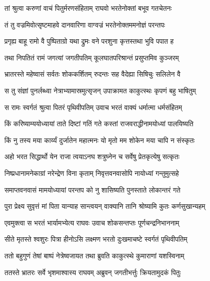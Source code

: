 
\twolineshloka
{तां श्रुत्वा करुणां वाचं पितुर्मरणसंहिताम्}
{राघवो भरतेनोक्तां बभूव गतचेतनः} %

\twolineshloka
{तं तु वज्रमिवोत्सृष्टमाहवे दानवारिणा}
{वाग्वज्रं भरतेनोक्तममनोज्ञं परन्तपः} %

\twolineshloka
{प्रगृह्य बाहू रामो वै पुष्पिताग्रो यथा द्रुमः}
{वने परशुना कृत्तस्तथा भुवि पपात ह} %

\twolineshloka
{तथा निपतितं रामं जगत्यां जगतीपतिम्}
{कूलघातपरिश्रान्तं प्रसुप्तमिव कुञ्जरम्} %

\twolineshloka
{भ्रातरस्ते महेष्वासं सर्वतः शोककर्शितम्}
{रुदन्तः सह वैदेह्या सिषिचुः सलिलेन वै} %

\twolineshloka
{स तु संज्ञां पुनर्लब्ध्वा नेत्राभ्यामास्रमुत्सृजन्}
{उपाक्रामत काकुत्स्थः कृपणं बहु भाषितुम्} %

\twolineshloka
{स रामः स्वर्गतं श्रुत्वा पितरं पृथिवीपतिम्}
{उवाच भरतं वाक्यं धर्मात्मा धर्मसंहितम्} %

\twolineshloka
{किं करिष्याम्ययोध्यायां ताते दिष्टां गतिं गते}
{कस्तां राजवराद्धीनामयोध्यां पालयिष्यति} %

\twolineshloka
{किं नु तस्य मया कार्य्यं दुर्जातेन महात्मनः}
{यो मृतो मम शोकेन मया चापि न संस्कृतः} %

\twolineshloka
{अहो भरत सिद्धार्थो येन राजा त्वयाऽनघ}
{शत्रुघ्नेन च सर्वेषु प्रेतकृत्येषु सत्कृतः} %

\twolineshloka
{निष्प्रधानामनेकाग्रां नरेन्द्रेण विना कृताम्}
{निवृत्तवनवासोपि नायोध्यां गन्तुमुत्सहे} %

\twolineshloka
{समाप्तवनवासं मामयोध्यायां परन्तप}
{को नु शासिष्यति पुनस्ताते लोकान्तरं गते} %

\twolineshloka
{पुरा प्रेक्ष्य सुवृत्तं मां पिता यान्याह सान्त्वयन्}
{वाक्यानि तानि श्रोष्यामि कुतः कर्णसुखान्यहम्} %

\twolineshloka
{एवमुक्त्वा स भरतं भार्यामभ्येत्य राघवः}
{उवाच शोकसन्तप्तः पूर्णचन्द्रनिभाननाम्} %

\twolineshloka
{सीते मृतस्ते श्वशुरः पित्रा हीनोऽसि लक्ष्मण}
{भरतो दुःखमाचष्टे स्वर्गतं पृथिवीपतिम्} %

\twolineshloka
{ततो बहुगुणं तेषां बाष्पं नेत्रेष्वजायत}
{तथा ब्रुवति काकुत्स्थे कुमाराणां यशस्विनाम्} %

\twolineshloka
{ततस्ते भ्रातरः सर्वे भृशमाश्वास्य राघवम्}
{अब्रुवन् जगतीभर्त्तुः क्रियतामुदकं पितुः} %

